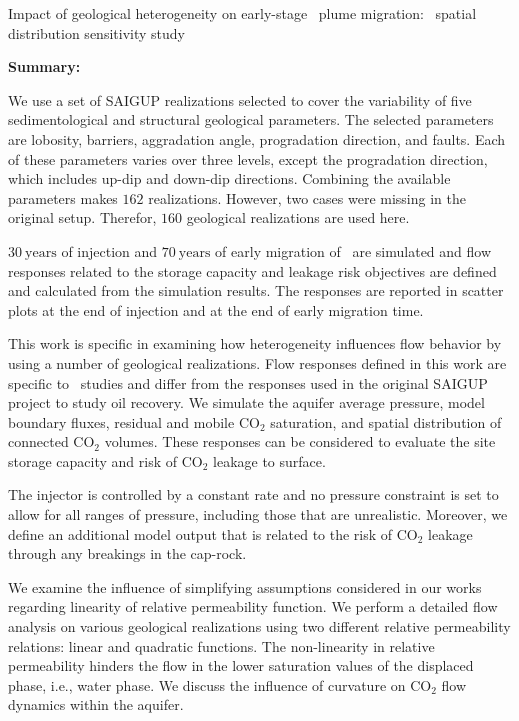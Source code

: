 {Impact of geological heterogeneity on early-stage \coo\ plume migration: \coo\
spatial distribution sensitivity study}
{
\textbf{Summary:}

We use a set of SAIGUP realizations selected to cover the variability of five
sedimentological and structural geological parameters. The selected parameters are
lobosity, barriers, aggradation angle, progradation direction, and faults. Each
of these parameters varies over three levels, except the progradation direction,
which includes up-dip and down-dip directions. Combining the available 
parameters makes $162$ realizations. However, two cases were missing in the original setup. Therefor, $160$ geological realizations are used here.

$30~\mbox{years}$ of injection and $70~\mbox{years}$ of early migration of \coo\ are simulated and flow responses related to the storage
capacity and leakage risk objectives are defined and calculated from
the simulation results. The responses are reported in scatter plots at the end of
injection and at the end of early migration time. 

This work is specific in examining how heterogeneity influences flow behavior
by using a number of geological realizations. Flow responses defined in
this work are specific to \coo\ studies and differ from the responses
used in the original SAIGUP project to study oil recovery. We simulate the
aquifer average pressure,  model boundary fluxes, residual and mobile CO$_2$
saturation, and spatial distribution of connected CO$_2$ volumes. These
responses can be considered to evaluate the site storage capacity and risk of
CO$_2$ leakage to surface. 

The injector is controlled by a constant rate and no pressure constraint is set
to allow for all ranges of pressure, including those that are unrealistic.
Moreover, we define an additional model output that is related to the risk of
CO$_2$ leakage through any breakings in the cap-rock.

We examine the influence of simplifying assumptions considered in our works
regarding linearity of relative permeability function. We perform a detailed
flow analysis on various geological realizations using two different relative
permeability relations: linear and quadratic functions. The non-linearity in
relative permeability hinders the flow in the lower saturation values of the
displaced phase, i.e., water phase. We discuss the influence of curvature on
$\mbox{CO}_2$ flow dynamics within the aquifer. 

}
